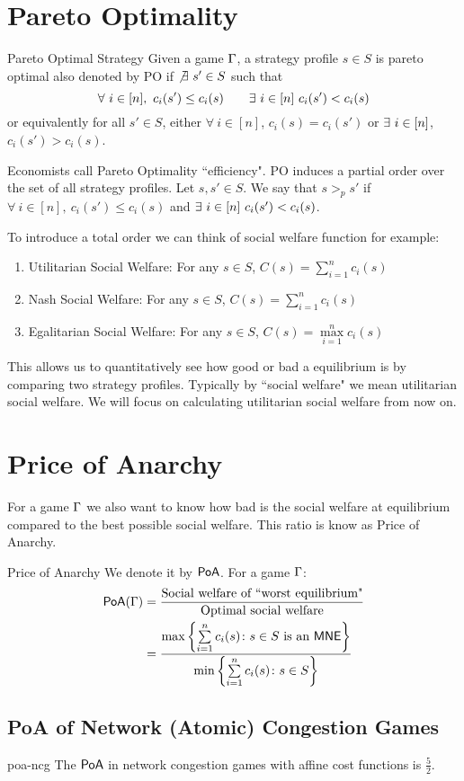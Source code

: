 \section{Pareto Optimality}
\begin{definition}{Pareto Optimal Strategy}{}
Given a game $\Gamma$, a strategy profile $s\in S$	is pareto optimal also denoted by \textsf{PO} if $\not\exists\ s'\in S$ such that $$\forall\ i\in[n],\ c_i(s')\leq c_i(s)\qquad\exs\ i\in[n]\ c_i(s')<c_i(s)$$or equivalently for all $s'\in S$, either $\forall\ i\in[n]$, $c_i(s)=c_i(s')$ or $\exists\ i\in[n]$, $c_i(s')>c_i(s)$.
\end{definition}

Economists call Pareto Optimality ``efficiency". \textsf{PO} induces a partial order over the set of all strategy profiles. Let $s,s'\in S$. We say that $s>_ps'$ if $\forall\ i\in[n],\ c_i(s')\leq c_i(s)$ and $\exs\ i\in[n]\ c_i(s')<c_i(s)$.

To introduce a total order we can think of  social welfare function for example:
\begin{enumerate}[label=(\arabic*)]
	\item Utilitarian Social Welfare: For any $s\in S$, $C(s)=\sum\limits_{i=1}^n c_i(s)$
	\item Nash Social Welfare: For any $s\in S$, $C(s)=\sum\limits_{i=1}^n c_i(s)$
	\item Egalitarian Social Welfare: For any $s\in S$, $C(s)=\max\limits_{i=1}^n c_i(s)$
\end{enumerate}This allows us to quantitatively see how good or bad a equilibrium is by comparing two strategy profiles. Typically by ``social welfare" we mean utilitarian social welfare. We will focus on calculating utilitarian social welfare from now on.
\section{Price of Anarchy}

For a game $\Gamma$ we also want to know how bad is the social welfare at equilibrium compared to the best possible social welfare. This ratio is know as Price of Anarchy.
\begin{definition}{Price of Anarchy}{}
	We denote it by $\operatorname{\mathsf{PoA}}$. For a game $\Gamma$:\begin{align*}
		\operatorname{\mathsf{PoA}}(\Gamma)& =\frac{\text{Social welfare of ``worst equilibrium"}}{\text{Optimal social welfare}}\\
		&= \frac{\max\left\{\sum\limits_{i=1}^n c_i(s)\colon s\in S\text{ is an $\operatorname{\mathsf{MNE}}$}\right\}}{\min\left\{\sum\limits_{i=1}^n c_i(s)\colon s\in S\right\}}
	\end{align*}
\end{definition}
\subsection{\textsf{PoA} of Network (Atomic) Congestion Games}
\begin{Theorem}{}{poa-ncg}
	The $\operatorname{\mathsf{PoA}}$ in network congestion games with affine cost functions is $\frac{5}2$.
\end{Theorem}

